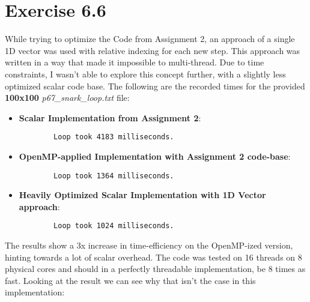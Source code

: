 \documentclass[a4paper]{article}
\begin{document}
\section*{Exercise 6.6}
While trying to optimize the Code from Assignment 2, an approach of a single 1D vector was used with relative indexing for each new step. This approach was written in a way that made it impossible to multi-thread. Due to time constraints, I wasn't able to explore this concept further, with a slightly less optimized scalar code base. The following are the recorded times for the provided \textbf{100x100} \textit{p67\_snark\_loop.txt} file:
\begin{itemize}
    \item \textbf{Scalar Implementation from Assignment 2}:
    \begin{lstlisting}
        Loop took 4183 milliseconds.
    \end{lstlisting}
    \item \textbf{OpenMP-applied Implementation with Assignment 2 code-base}:
    \begin{lstlisting}
        Loop took 1364 milliseconds.
    \end{lstlisting}
    \item \textbf{Heavily Optimized Scalar Implementation with 1D Vector approach}:
    \begin{lstlisting}
        Loop took 1024 milliseconds.
    \end{lstlisting}
\end{itemize}
The results show a 3x increase in time-efficiency on the OpenMP-ized version, hinting towards a lot of scalar overhead. The code was tested on 16 threads on 8 physical cores and should in a perfectly threadable implementation, be 8 times as fast. Looking at the result we can see why that isn't the case in this implementation:
\end{document}
